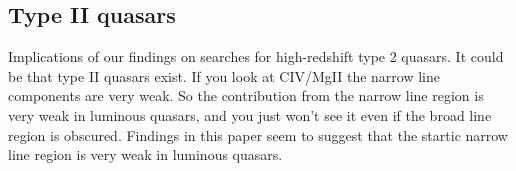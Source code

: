 \subsection{Type II quasars}

Implications of our findings on searches for high-redshift type 2 quasars. It could be that type II quasars exist. If you look at CIV/MgII the narrow line components are very weak. So the contribution from the narrow line region is very weak in luminous quasars, and you just won't see it even if the broad line region is obscured.
Findings in this paper seem to suggest that the startic narrow line region is very weak in luminous quasars. 
